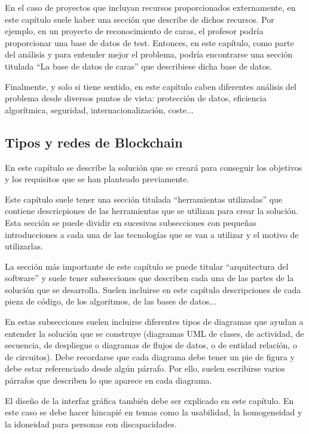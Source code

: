 \documentclass[12pt,spanish,chapterprefix, numbers=noenddot]{book}
\numberwithin{equation}{section}
\numberwithin{figure}{section}
\begin{document}
    En el caso de proyectos que incluyan recursos proporcionados externamente,
    en este capítulo suele haber una sección que describe de dichos recursos.
    Por ejemplo, en un proyecto de reconocimiento de caras, el profesor
    podría proporcionar una base de datos de test. Entonces, en este capítulo,
    como parte del análisis y para entender mejor el problema, podría
    encontrarse una sección titulada ``La base de datos de caras'' que
    describiese dicha base de datos.

    Finalmente, y solo si tiene sentido, en este capítulo caben diferentes
    análisis del problema desde diversos puntos de vista: protección de
    datos, eficiencia algorítmica, seguridad, internacionalización, coste...

    \subsection{Tipos y redes de Blockchain}

    En este capítulo se describe la solución que se creará para conseguir
    los objetivos y los requisitos que se han planteado previamente.

    Este capítulo suele tener una sección titulada ``herramientas utilizadas''
    que contiene descricpiones de las herramientas que se utilizan para
    crear la solución. Esta sección se puede dividir en sucesivas subsecciones
    con pequeñas introducciones a cada una de las tecnologías que se van
    a utilizar y el motivo de utilizarlas.

    La sección más importante de este capítulo se puede titular ``arquitectura
    del software'' y suele tener subsecciones que describen cada una
    de las partes de la solución que se desarrolla. Suelen incluirse en
    este capítulo descripciones de cada pieza de código, de los algoritmos,
    de las bases de datos...

    En estas subsecciones suelen incluirse diferentes tipos de diagramas
    que ayudan a entender la solución que se construye (diagramas UML
    de clases, de actividad, de secuencia, de despliegue o diagramas de
    flujos de datos, o de entidad relación, o de circuitos). Debe recordarse
    que cada diagrama debe tener un pie de figura y debe estar referenciado
    desde algún párrafo. Por ello, suelen escribirse varios párrafos que
    describen lo que aparece en cada diagrama.

    El diseño de la interfaz gráfica también debe ser explicado en este
    capítulo. En este caso se debe hacer hincapié en temas como la usabilidad,
    la homogeneidad y la idoneidad para personas con discapacidades.
\end{document}
